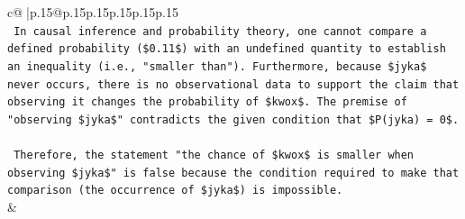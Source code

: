\documentclass{article}
\begin{document}
{\begin{supertabular}{c@{$\;$}|p{.15\linewidth}@{}p{.15\linewidth}p{.15\linewidth}p{.15\linewidth}p{.15\linewidth}p{.15\linewidth}}
{{{\\ 
\texttt{    In causal inference and probability theory, one cannot compare a defined probability (\$0.11\$) with an undefined quantity to establish an inequality (i.e., "smaller than"). Furthermore, because \$jyka\$ never occurs, there is no observational data to support the claim that observing it changes the probability of \$kwox\$. The premise of "observing \$jyka\$" contradicts the given condition that \$P(jyka) = 0\$.} \\
\\ 
\texttt{    Therefore, the statement "the chance of \$kwox\$ is smaller when observing \$jyka\$" is false because the condition required to make that comparison (the occurrence of \$jyka\$) is impossible.} \\
            }
        }
    }
    & \\ \\


\end{supertabular}}
\end{document}
